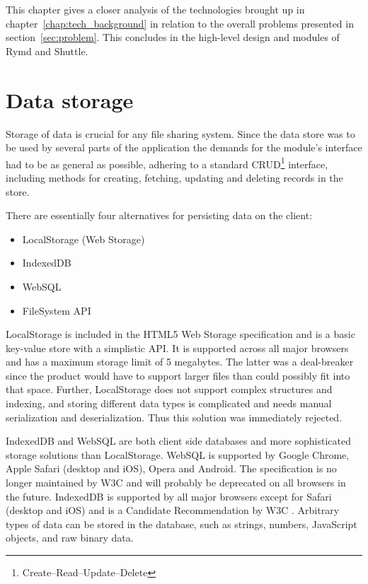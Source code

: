 This chapter gives a closer analysis of the technologies brought up in chapter~\ref{chap:tech_background} in relation to the overall problems presented in section~\ref{sec:problem}. This concludes in the high-level design and modules of Rymd and Shuttle.


\section{Data storage}
\label{sec:datastorage}
Storage of data is crucial for any file sharing system. Since the data store was to be used by several parts of the application the demands for the module's interface had to be as general as possible, adhering to a standard CRUD\footnote{Create–Read–Update–Delete} interface, including methods for creating, fetching, updating and deleting records in the store.

There are essentially four alternatives for persisting data on the client:

\begin{itemize}
\item LocalStorage (Web Storage)
\item IndexedDB
\item WebSQL
\item FileSystem API
\end{itemize}

LocalStorage is included in the HTML5 Web Storage specification \cite{WebStorage:Online} and is a basic key-value store with a simplistic API. It is supported across all major browsers and has a maximum storage limit of 5 megabytes. The latter was a deal-breaker since the product would have to support larger files than could possibly fit into that space. Further, LocalStorage does not support complex structures and indexing, and storing different data types is complicated and needs manual serialization and deserialization. Thus this solution was immediately rejected.

IndexedDB and WebSQL are both client side databases and more sophisticated storage solutions than LocalStorage. WebSQL is supported by Google Chrome, Apple Safari (desktop and iOS), Opera and Android. The specification is no longer maintained by W3C \cite{WebSQL:Online} and will probably be deprecated on all browsers in the future. IndexedDB is supported by all major browsers except for Safari (desktop and iOS) and is a Candidate Recommendation by W3C \cite{IndexedDB:Online}. Arbitrary types of data can be stored in the database, such as strings, numbers, JavaScript objects, and raw binary data.

